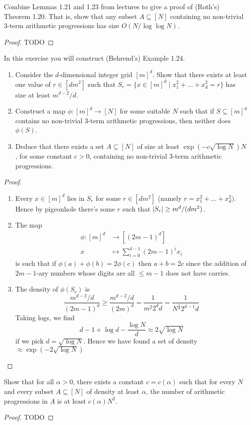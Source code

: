 \documentclass{article}
\begin{document}
\begin{problem}
  Combine Lemmas 1.21 and 1.23 from lectures to give a proof of (Roth’s) Theorem 1.20. That is, show that any subset $A \subseteq [N]$ containing no non-trivial 3-term arithmetic progressions has size $O(N / \log\log N)$.
\end{problem}
\begin{proof}
  TODO
\end{proof}

\begin{problem}
  In this exercise you will construct (Behrend’s) Example 1.24.
  \begin{enumerate}
    \item Consider the $d$-dimensional integer grid $[m]^d$. Show that there exists at least one value of $r \in [dm^2]$ such that $S_r = \{x \in [m]^d \mid x_1^2 + \dots + x_d^2 = r\}$ has size at least $m^{d - 2}/d$.
    \item Construct a map $\phi : [m]^d \to [N]$ for some suitable $N$ such that if $S \subseteq [m]^d$ contains no non-trivial 3-term arithmetic progressions, then neither does $\phi(S)$.
    \item Deduce that there exists a set $A \subseteq [N]$ of size at least $\exp(-c\sqrt{\log N})N$, for some constant $c > 0$, containing no non-trivial 3-term arithmetic progressions.
  \end{enumerate}
\end{problem}
\begin{proof}~
  \begin{enumerate}
    \item Every $x \in [m]^d$ lies in $S_r$ for some $r \in [dm^2]$ (namely $r = x_1^2 + \dots + x_d^2)$. Hence by pigeonhole there's some $r$ such that $\left\lvert S_r\right\rvert \ge m^d/(dm^2)$.
    \item The map
    \begin{align*}
      \phi : [m]^d & \to [(2m - 1)^d] \\
      x & \mapsto \sum_{i = 0}^{d - 1} (2m - 1)^i x_i
    \end{align*}
    is such that if $\phi(a) + \phi(b) = 2\phi(c)$ then $a + b = 2c$ since the addition of $2m - 1$-ary numbers whose digits are all $\le m - 1$ does not have carries.
    \item The density of $\phi(S_r)$ is
    $$\frac{m^{d - 2}/d}{(2m - 1)^d} \ge \frac{m^{d - 2}/d}{(2m)^d} = \frac 1{m^2 2^d d} = \frac 1{N^{\frac 1d} 2^{d - 1} d}$$
    Taking logs, we find
    $$d - 1 + \log d - \frac{\log N}d \approx 2\sqrt{\log N}$$
    if we pick $d = \sqrt{\log N}$. Hence we have found a set of density $\approx \exp(-2\sqrt{\log N})$
  \end{enumerate}
\end{proof}

\begin{problem}
  Show that for all $\alpha > 0$, there exists a constant $c = c(\alpha)$ such that for every $N$ and every subset $A \subseteq [N]$ of density at least $\alpha$, the number of  arithmetic progressions in $A$ is at least $c(\alpha)N^2$.
\end{problem}
\begin{proof}
  TODO
\end{proof}
\end{document}
